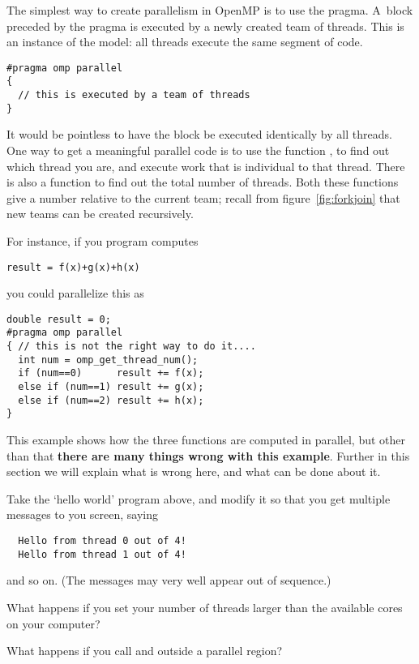 The simplest way to create parallelism in OpenMP is to use
the  pragma. A~block preceded by the  pragma
is executed by a newly created team of threads. 
This is an instance of the  model: all threads execute the same
segment of code.
\begin{verbatim}
#pragma omp parallel
{
  // this is executed by a team of threads
}
\end{verbatim}
It would be pointless to have the block be executed identically by
all threads. One way to get a meaningful parallel code is to use the function
, to find out which thread you are,
and execute work that is individual to that thread.
There is also a function
 to find out the total number of threads.
Both these functions give a number relative to the current team;
recall from figure~\ref{fig:forkjoin} that new teams can be created recursively.

For instance, if you program computes
\begin{verbatim}
result = f(x)+g(x)+h(x)
\end{verbatim}
you could parallelize this as
\begin{verbatim}
double result = 0;
#pragma omp parallel
{ // this is not the right way to do it....
  int num = omp_get_thread_num();
  if (num==0)      result += f(x);
  else if (num==1) result += g(x);
  else if (num==2) result += h(x);
}
\end{verbatim}
This example shows how the three functions are computed in parallel,
but other than that \textbf{there are many things wrong with this example}.
Further in this section we will explain what is wrong here,
and what can be done about it.

\begin{exercise}
  Take the `hello world' program above, and modify it so that you get
  multiple messages to you screen, saying
\begin{verbatim}
  Hello from thread 0 out of 4!
  Hello from thread 1 out of 4!
\end{verbatim}
  and so on. (The messages may very well appear out of sequence.)


  What happens if you set your number of threads larger than the available
  cores on your computer?
\end{exercise}

\begin{exercise}
  What happens if you call  and 
  outside a parallel region?
\end{exercise}

